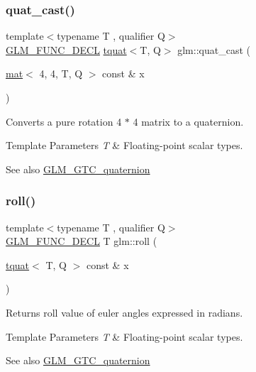 \subsubsection{\texorpdfstring{quat\+\_\+cast()}{quat\_cast()}\hspace{0.1cm}{\footnotesize\ttfamily [2/2]}}
{\footnotesize\ttfamily template$<$typename T , qualifier Q$>$ \\
\hyperlink{setup_8hpp_ab2d052de21a70539923e9bcbf6e83a51}{G\+L\+M\+\_\+\+F\+U\+N\+C\+\_\+\+D\+E\+CL} \hyperlink{structglm_1_1tquat}{tquat}$<$T, Q$>$ glm\+::quat\+\_\+cast (\begin{DoxyParamCaption}\item[{\hyperlink{structglm_1_1mat}{mat}$<$ 4, 4, T, Q $>$ const \&}]{x }\end{DoxyParamCaption})}

Converts a pure rotation 4 $\ast$ 4 matrix to a quaternion.


\begin{DoxyTemplParams}{Template Parameters}
{\em T} & Floating-\/point scalar types.\\
\hline
\end{DoxyTemplParams}
\begin{DoxySeeAlso}{See also}
\hyperlink{group__gtc__quaternion}{G\+L\+M\+\_\+\+G\+T\+C\+\_\+quaternion} 
\end{DoxySeeAlso}
\mbox{\label{group__gtc__quaternion_ga3ff93afbd9cc29f2ad217f2228e8a95b}} 
\subsubsection{\texorpdfstring{roll()}{roll()}}
{\footnotesize\ttfamily template$<$typename T , qualifier Q$>$ \\
\hyperlink{setup_8hpp_ab2d052de21a70539923e9bcbf6e83a51}{G\+L\+M\+\_\+\+F\+U\+N\+C\+\_\+\+D\+E\+CL} T glm\+::roll (\begin{DoxyParamCaption}\item[{\hyperlink{structglm_1_1tquat}{tquat}$<$ T, Q $>$ const \&}]{x }\end{DoxyParamCaption})}

Returns roll value of euler angles expressed in radians.


\begin{DoxyTemplParams}{Template Parameters}
{\em T} & Floating-\/point scalar types.\\
\hline
\end{DoxyTemplParams}
\begin{DoxySeeAlso}{See also}
\hyperlink{group__gtc__quaternion}{G\+L\+M\+\_\+\+G\+T\+C\+\_\+quaternion} 
\end{DoxySeeAlso}
\mbox{\label{group__gtc__quaternion_ga21c6e3b6104c9b8116a35ddf2ac4d358}} 
